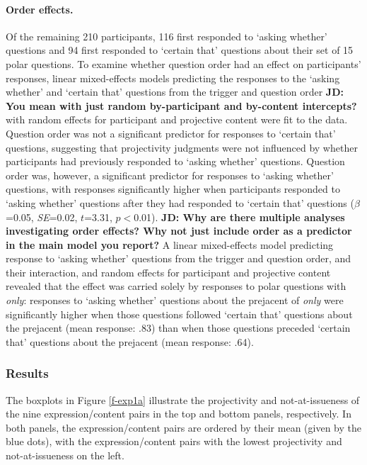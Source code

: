 \documentclass[11pt,fleqn]{article}
\newcommand{\6}{\mbox{$[\hspace*{-.6mm}[$}}
\newcommand{\9}{\mbox{$]\hspace*{-.6mm}]$}}
\begin{document}
\paragraph{Order effects.} Of the remaining 210 participants, 116 first responded to `asking whether' questions and 94 first responded to `certain that' questions about their set of 15 polar questions. To examine whether question order had an effect on participants' responses, linear mixed-effects models predicting the responses to the `asking whether' and `certain that' questions from the trigger and question order {\bf JD: You mean with just random by-participant and by-content intercepts?} with random effects for participant and projective content were fit to the data. Question order was not a significant predictor for responses to `certain that' questions, suggesting that projectivity judgments were not influenced by whether participants had previously responded to `asking whether' questions. Question order was, however, a significant predictor for responses to `asking whether' questions, with responses significantly higher when participants responded to `asking whether' questions after they had responded to `certain that' questions ($\beta$=0.05,  {\em SE}=0.02, $t$=3.31, $p<$0.01). {\bf JD: Why are there multiple analyses investigating order effects? Why not just include order as a predictor in the main model you report?} A linear mixed-effects model predicting response to `asking whether' questions from the trigger and question order, and their interaction, and random effects for participant and projective content revealed that the effect was carried solely by responses to polar questions with {\em only}: responses to `asking whether' questions about the prejacent of {\em only} were significantly higher when those questions followed `certain that' questions about the prejacent (mean response: .83) than when those questions preceded `certain that' questions about the prejacent (mean response: .64).

\subsubsection{Results}

The boxplots in Figure \ref{f-exp1a} illustrate the projectivity and not-at-issueness of the nine expression/content pairs in the top and bottom panels, respectively. In both panels, the expression/content pairs are ordered by their mean (given by the blue dots), with the expression/content pairs with the lowest projectivity and not-at-issueness on the left. 
\end{document}
